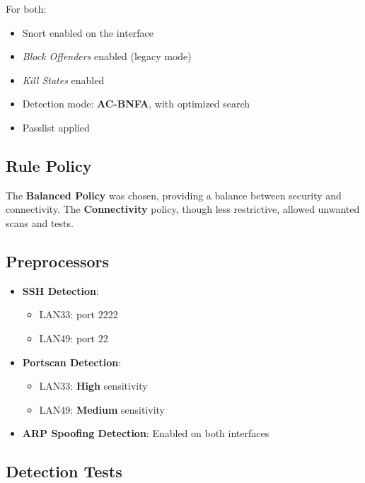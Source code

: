 \documentclass[12pt]{report}
\begin{document}
For both:
\begin{itemize}
    \item Snort enabled on the interface
    \item \textit{Block Offenders} enabled (legacy mode)
    \item \textit{Kill States} enabled
    \item Detection mode: \textbf{AC-BNFA}, with optimized search
    \item Passlist applied
\end{itemize}

\subsection*{Rule Policy}

The \textbf{Balanced Policy} was chosen, providing a balance between security and connectivity. The \textbf{Connectivity} policy, though less restrictive, allowed unwanted scans and tests.

\subsection*{Preprocessors}

\begin{itemize}
    \item \textbf{SSH Detection}:
    \begin{itemize}
        \item LAN33: port 2222
        \item LAN49: port 22
    \end{itemize}
    \item \textbf{Portscan Detection}:
    \begin{itemize}
        \item LAN33: \textbf{High} sensitivity
        \item LAN49: \textbf{Medium} sensitivity
    \end{itemize}
    \item \textbf{ARP Spoofing Detection}: Enabled on both interfaces
\end{itemize}

\subsection*{Detection Tests}
\end{document}

